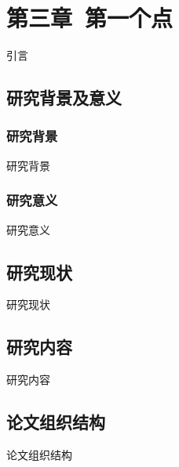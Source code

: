 \setcounter{section}{3}
\setcounter{subsection}{0}
\section*{第三章\ 第一个点}
引言
\subsection{研究背景及意义}
\subsubsection{研究背景}
研究背景
\subsubsection{研究意义}
研究意义
\subsection{研究现状}
研究现状
\subsection{研究内容}
研究内容
\subsection{论文组织结构}
论文组织结构

\pagestyle{fancy}			%
\chead{}	%

